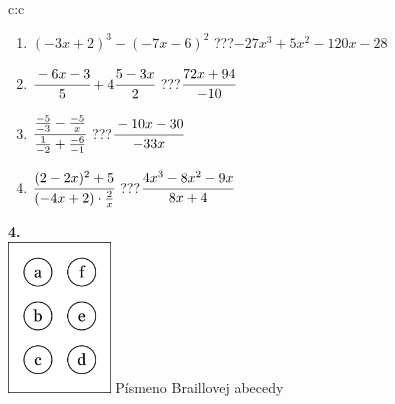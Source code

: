 \documentclass[10pt]{report}
\begin{document}
\begin{tabular}{c:c}
\begin{minipage}[c][104.5mm][t]{0.5\linewidth}
\begin{center}
\begin{minipage}{0.79\linewidth}
\begin{center}
\begin{varwidth}{\linewidth}
\begin{enumerate}
\item $(-3x+2)^3-(-7x-6)^2$\quad \dotfill\; ???\;\dotfill \quad $-27x^3+5x^2-120x-28$
\item $\cfrac{-6x-3}{5}+4\cfrac{5-3x}{2}$\quad \dotfill\; ???\;\dotfill \quad $\cfrac{72x+94}{-10}$
\item $\cfrac{\frac{-5}{-3}-\frac{-5}{x}}{\frac{1}{-2}+\frac{-6}{-1}}$\quad \dotfill\; ???\;\dotfill \quad $\cfrac{-10x-30}{-33x}$
\item $\cfrac{(2-2x)^2+5}{(-4x+2)\cdot\frac{2}{x}}$\quad \dotfill\; ???\;\dotfill \quad $\cfrac{4x^3-8x^2-9x}{8x+4}$
\end{enumerate}
\end{varwidth}
\end{center}
\end{minipage}
\begin{minipage}{0.20\linewidth}
\begin{center}
{\Huge\bfseries 4.} \\[2mm]
\includegraphics[height=40mm]{../images/braille.png}
{\small Písmeno Braillovej abecedy}
\end{center}
\end{minipage}
\end{center}
\end{minipage}
%
\end{tabular}
\newpage
\thispagestyle{empty}
\end{document}
